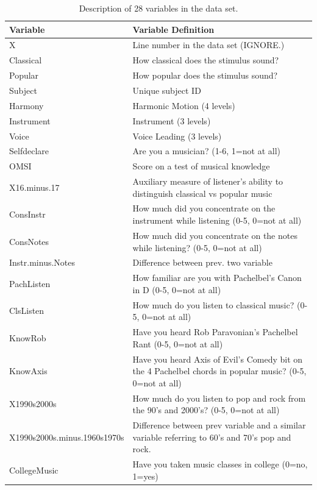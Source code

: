 \documentclass{article}
\begin{document}
\begin{table}
\caption{Description of 28 variables in the data set.\label{table:vardef}}
\ttfamily
\bigbreak
\begin{tabular}{| P{5cm} | m{10.8cm} |}
\hline
\textbf{Variable} & \textbf{Variable Definition} \\
\hline\hline
X & Line number in the data set (IGNORE.) \\
\hline
Classical & How classical does the stimulus sound? \\
\hline
Popular & How popular does the stimulus sound? \\
\hline
Subject & Unique subject ID \\
\hline
Harmony & Harmonic Motion (4 levels) \\
\hline
Instrument & Instrument (3 levels) \\
\hline
Voice & Voice Leading (3 levels) \\
\hline
Selfdeclare & Are you a musician? (1-6, 1=not at all) \\
\hline
OMSI & Score on a test of musical knowledge \\
\hline
X16.minus.17 & Auxiliary measure of listener’s ability to distinguish classical vs popular music \\
\hline
ConsInstr & How much did you concentrate on the instrument while listening (0-5, 0=not at all) \\
\hline
ConsNotes & How much did you concentrate on the notes while listening? (0-5, 0=not at all) \\
\hline
Instr.minus.Notes & Difference between prev. two variable \\
\hline
PachListen & How familiar are you with Pachelbel’s Canon in D (0-5, 0=not at all) \\
\hline
ClsListen & How much do you listen to classical music? (0-5, 0=not at all) \\
\hline
KnowRob & Have you heard Rob Paravonian’s Pachelbel Rant (0-5, 0=not at all) \\
\hline
KnowAxis & Have you heard Axis of Evil’s Comedy bit on the 4 Pachelbel chords in popular music? (0-5, 0=not at all) \\
\hline
X1990s2000s & How much do you listen to pop and rock from the 90’s and 2000’s? (0-5, 0=not at all) \\
\hline
X1990s2000s.minus.1960s1970s & Difference between prev variable and a similar variable referring to 60’s and 70’s pop and rock. \\
\hline
CollegeMusic & Have you taken music classes in college (0=no, 1=yes) \\

\end{tabular}
\end{table}
\end{document}
